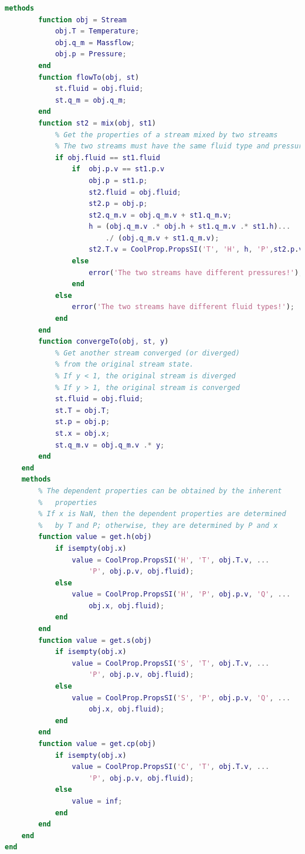 \begin{lstlisting}[language= MATLAB, backgroundcolor = \color{yellow!20}, caption = {The MATLAB source code of the definition of the class -- Stream}, label = {lst:MATLAB_SOURCECODE}]
    methods
        function obj = Stream
            obj.T = Temperature;
            obj.q_m = Massflow;
            obj.p = Pressure;
        end
        function flowTo(obj, st)
            st.fluid = obj.fluid;
            st.q_m = obj.q_m;
        end
        function st2 = mix(obj, st1)
            % Get the properties of a stream mixed by two streams
            % The two streams must have the same fluid type and pressure
            if obj.fluid == st1.fluid
                if  obj.p.v == st1.p.v
                    obj.p = st1.p;
                    st2.fluid = obj.fluid;
                    st2.p = obj.p;
                    st2.q_m.v = obj.q_m.v + st1.q_m.v;
                    h = (obj.q_m.v .* obj.h + st1.q_m.v .* st1.h)...
                        ./ (obj.q_m.v + st1.q_m.v);
                    st2.T.v = CoolProp.PropsSI('T', 'H', h, 'P',st2.p.v);
                else
                    error('The two streams have different pressures!');
                end
            else
                error('The two streams have different fluid types!');
            end
        end
        function convergeTo(obj, st, y)
            % Get another stream converged (or diverged)
            % from the original stream state.
            % If y < 1, the original stream is diverged
            % If y > 1, the original stream is converged
            st.fluid = obj.fluid;
            st.T = obj.T;
            st.p = obj.p;
            st.x = obj.x;
            st.q_m.v = obj.q_m.v .* y;
        end
    end
    methods
        % The dependent properties can be obtained by the inherent
        %   properties
        % If x is NaN, then the dependent properties are determined
        %   by T and P; otherwise, they are determined by P and x
        function value = get.h(obj)
            if isempty(obj.x)
                value = CoolProp.PropsSI('H', 'T', obj.T.v, ...
                    'P', obj.p.v, obj.fluid);
            else
                value = CoolProp.PropsSI('H', 'P', obj.p.v, 'Q', ...
                    obj.x, obj.fluid);
            end
        end
        function value = get.s(obj)
            if isempty(obj.x)
                value = CoolProp.PropsSI('S', 'T', obj.T.v, ...
                    'P', obj.p.v, obj.fluid);
            else
                value = CoolProp.PropsSI('S', 'P', obj.p.v, 'Q', ...
                    obj.x, obj.fluid);
            end
        end
        function value = get.cp(obj)
            if isempty(obj.x)
                value = CoolProp.PropsSI('C', 'T', obj.T.v, ...
                    'P', obj.p.v, obj.fluid);
            else
                value = inf;
            end
        end
    end
end
\end{lstlisting}

